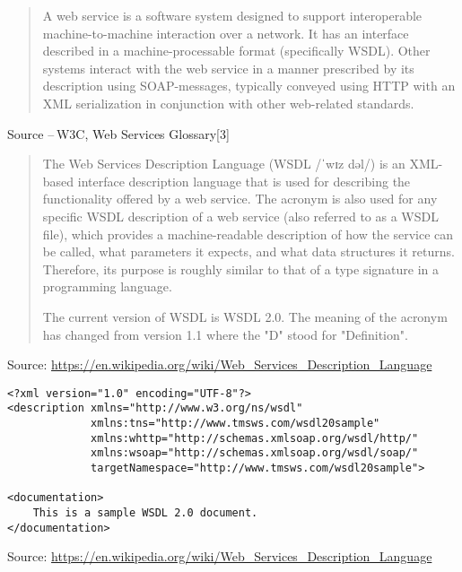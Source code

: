 \documentclass[Screen16to9,17pt]{foils}
\begin{document}

\begin{quote}
A web service is a software system designed to support interoperable machine-to-machine interaction over a network. It has an interface described in a machine-processable format (specifically WSDL). Other systems interact with the web service in a manner prescribed by its description using SOAP-messages, typically conveyed using HTTP with an XML serialization in conjunction with other web-related standards.
\end{quote}
Source -- W3C, Web Services Glossary[3]



\begin{quote}
  The Web Services Description Language (WSDL /ˈwɪz dəl/) is an XML-based interface description language that is used for describing the functionality offered by a web service. The acronym is also used for any specific WSDL description of a web service (also referred to as a WSDL file), which provides a machine-readable description of how the service can be called, what parameters it expects, and what data structures it returns. Therefore, its purpose is roughly similar to that of a type signature in a programming language.

  The current version of WSDL is WSDL 2.0. The meaning of the acronym has changed from version 1.1 where the "D" stood for "Definition".
\end{quote}
Source: \url{https://en.wikipedia.org/wiki/Web_Services_Description_Language}



\begin{verbatim}
<?xml version="1.0" encoding="UTF-8"?>
<description xmlns="http://www.w3.org/ns/wsdl"
             xmlns:tns="http://www.tmsws.com/wsdl20sample"
             xmlns:whttp="http://schemas.xmlsoap.org/wsdl/http/"
             xmlns:wsoap="http://schemas.xmlsoap.org/wsdl/soap/"
             targetNamespace="http://www.tmsws.com/wsdl20sample">

<documentation>
    This is a sample WSDL 2.0 document.
</documentation>
\end{verbatim}
Source: \url{https://en.wikipedia.org/wiki/Web_Services_Description_Language}
\end{document}
